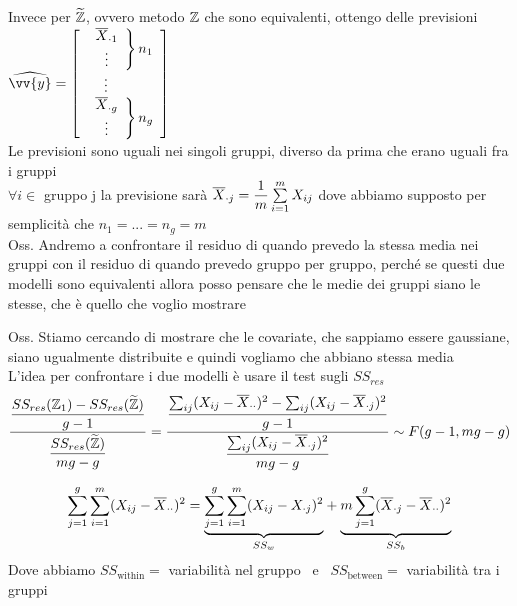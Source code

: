 Invece per $\widetilde{\mathbb Z}$, ovvero metodo $\mathbb Z$ che sono equivalenti, ottengo delle previsioni $\hat{\vv{y}}=\OO\begin{array}{c}
    \left.\begin{array}{c}
        \overline{X}_{\cdot 1} \\
        \vdots
    \end{array}\right\} n_1\\
    \vdots \hspace{20pt}\phantom{} \\
    \left.\begin{array}{c}
        \overline{X}_{\cdot g} \\
        \vdots
    \end{array}\right\} n_g
\end{array}\CC$\\
Le previsioni sono uguali nei singoli gruppi, diverso da prima che erano uguali fra i gruppi\\
$\forall i \in $ gruppo j la previsione sarà $\overline{X}_{\cdot j} = \dfrac{1}{m} \sum\limits_{i=1}^{m}X_{ij}$ dove abbiamo supposto per semplicità che $n_1=...=n_g = m$\\

Oss. Andremo a confrontare il residuo di quando prevedo la stessa media nei gruppi con il residuo di quando prevedo gruppo per gruppo, perché se questi due modelli sono equivalenti allora posso pensare che le medie dei gruppi siano le stesse, che è quello che voglio mostrare

Oss. Stiamo cercando di mostrare che le covariate, che sappiamo essere gaussiane, siano ugualmente distribuite e quindi vogliamo che abbiano stessa media\\

L'idea per confrontare i due modelli è usare il test sugli $SS_{res}$
\[
\dfrac{\dfrac{SS_{res}(\mathbb Z_1)-SS_{res}(\widetilde{\mathbb Z})}{g-1}}{\dfrac{SS_{res}(\widetilde{\mathbb Z})}{mg-g}} = \dfrac{\dfrac{ \sum_{ij} (X_{ij}-\overline{X}_{\cdot \cdot})^2 - \sum_{ij}(X_{ij}-\overline{X}_{\cdot j})^2 }{g-1}}{\dfrac{\sum_{ij}(X_{ij}-\overline{X}_{\cdot j})^2}{mg-g}} \sim F(g-1, mg-g)
\]



\[
\sum\limits_{j=1}^{g}\sum\limits_{i=1}^{m} (X_{ij}-\overline{X}_{\cdot \cdot})^2 = \underset{SS_w}{\underbrace{\sum\limits_{j=1}^{g}\sum\limits_{i=1}^{m}(X_{ij}-X_{\cdot j})^2}} + \underset{SS_b}{\underbrace{ m\sum\limits_{j=1}^{g} (\overline{X}_{\cdot j}-\overline{X}_{\cdot \cdot})^2}}
\]
Dove abbiamo $SS_{\text{within}} = $ variabilità nel gruppo \ e \ $SS_{\text{between}} = $ variabilità tra i gruppi\\

